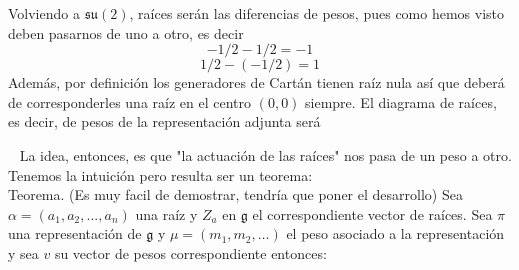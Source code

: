 \documentclass[12pt]{article}
\begin{document}
\noindent Volviendo a $\mathfrak{s}\mathfrak{u}(2)$,  raíces serán las diferencias de pesos, pues como hemos visto deben pasarnos de uno a otro, es decir
$$-1/2 - 1/2 =-1$$
$$1/2 - (-1/2)=1$$
Además, por definición los generadores de Cartán tienen raíz nula así que deberá de corresponderles una raíz en el centro $(0,0)$ siempre. 
El diagrama de raíces, es decir, de pesos de la representación adjunta será
\begin{center}
\end{center}\
La idea, entonces, es que "la actuación de las raíces" nos pasa de un peso a otro.  Tenemos la intuición pero resulta ser un teorema: \\
Teorema. (Es muy facil de demostrar, tendría que poner el desarrollo) Sea $ \alpha=(a_1, a_2, ...,a_n)$ una raíz y $Z_a$ en $\mathfrak{g}$ el correspondiente vector de raíces. Sea $\pi$ una representación de $\mathfrak{g}$ y $\mu=(m_1, m_2, \dots)$ el peso asociado a la representación y sea $v$ su vector de pesos correspondiente entonces: 
\end{document}
